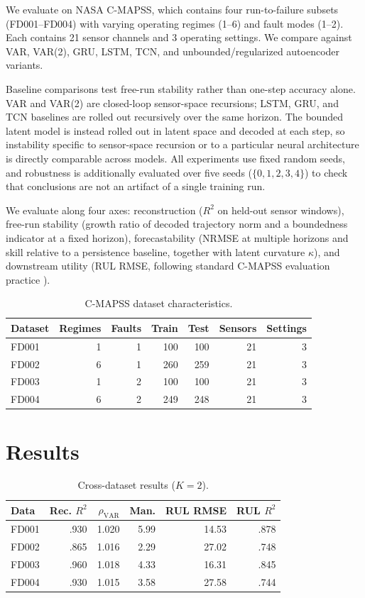 \documentclass[letterpaper]{article}
\begin{document}
We evaluate on NASA C-MAPSS, which contains four run-to-failure subsets (FD001--FD004) with varying operating regimes (1--6) and fault modes (1--2). Each contains 21 sensor channels and 3 operating settings. We compare against VAR, VAR(2), GRU, LSTM, TCN, and unbounded/regularized autoencoder variants.

Baseline comparisons test free-run stability rather than one-step accuracy alone. VAR and VAR(2) are closed-loop sensor-space recursions; LSTM, GRU, and TCN baselines are rolled out recursively over the same horizon. The bounded latent model is instead rolled out in latent space and decoded at each step, so instability specific to sensor-space recursion or to a particular neural architecture is directly comparable across models. All experiments use fixed random seeds, and robustness is additionally evaluated over five seeds ($\{0,1,2,3,4\}$) to check that conclusions are not an artifact of a single training run.

We evaluate along four axes: reconstruction ($R^2$ on held-out sensor windows), free-run stability (growth ratio of decoded trajectory norm and a boundedness indicator at a fixed horizon), forecastability (NRMSE at multiple horizons and skill relative to a persistence baseline, together with latent curvature $\kappa$), and downstream utility (RUL RMSE, following standard C-MAPSS evaluation practice \cite{saxena2008damage}).

\begin{table}[t]
\small
\centering
\caption{C-MAPSS dataset characteristics.}
\begin{tabular}{lrrrrrr}
\toprule
Dataset & Regimes & Faults & Train & Test & Sensors & Settings \\
\midrule
FD001 & 1 & 1 & 100 & 100 & 21 & 3 \\
FD002 & 6 & 1 & 260 & 259 & 21 & 3 \\
FD003 & 1 & 2 & 100 & 100 & 21 & 3 \\
FD004 & 6 & 2 & 249 & 248 & 21 & 3 \\
\bottomrule
\end{tabular}
\end{table}

\section{Results}

\begin{table}[t]
\small
\centering
\caption{Cross-dataset results ($K=2$).}
\begin{tabular}{lrrrrr}
\toprule
Data & Rec. $R^2$ & $\rho_{\text{VAR}}$ & Man. & RUL RMSE & RUL $R^2$ \\
\midrule
FD001 & .930 & 1.020 & 5.99 & 14.53 & .878 \\
FD002 & .865 & 1.016 & 2.29 & 27.02 & .748 \\
FD003 & .960 & 1.018 & 4.33 & 16.31 & .845 \\
FD004 & .930 & 1.015 & 3.58 & 27.58 & .744 \\
\bottomrule
\end{tabular}
\end{table}
\end{document}
